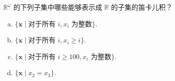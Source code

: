 \documentclass[../../main.tex]{subfiles}
\begin{document}
\begin{exercise}\label{exercise:ch01-笛卡儿积-5}
$\mathbb{R}^{\omega}$ 的下列子集中哪些能够表示成 $\mathbb{R}$ 的子集的笛卡儿积？
\begin{enumerate}[(a)]
\item $\{\boldsymbol{x} \mid \text{对于所有 } i, x_{i} \text{ 为整数}\}$.
\item $\{\boldsymbol{x} \mid \text{对于所有 } i, x_{i} \geqslant i\}$.
\item $\{\boldsymbol{x} \mid \text{对于所有 } i \geqslant 100, x_{i} \text{ 为整数}\}$.
\item $\{\boldsymbol{x} \mid x_{2} = x_{3}\}$.
\end{enumerate}
\end{exercise}
\end{document}

